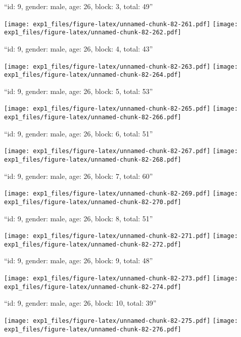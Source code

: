 \documentclass[11pt,,]{article}
\begin{document}
\newpage
[1] 

``id: 9, gender: male, age: 26, block: 3, total: 49''

\texttt{[image: exp1\_files/figure-latex/unnamed-chunk-82-261.pdf]}
\texttt{[image: exp1\_files/figure-latex/unnamed-chunk-82-262.pdf]}

\newpage
[1] 

``id: 9, gender: male, age: 26, block: 4, total: 43''

\texttt{[image: exp1\_files/figure-latex/unnamed-chunk-82-263.pdf]}
\texttt{[image: exp1\_files/figure-latex/unnamed-chunk-82-264.pdf]}

\newpage
[1] 

``id: 9, gender: male, age: 26, block: 5, total: 53''

\texttt{[image: exp1\_files/figure-latex/unnamed-chunk-82-265.pdf]}
\texttt{[image: exp1\_files/figure-latex/unnamed-chunk-82-266.pdf]}

\newpage
[1] 

``id: 9, gender: male, age: 26, block: 6, total: 51''

\texttt{[image: exp1\_files/figure-latex/unnamed-chunk-82-267.pdf]}
\texttt{[image: exp1\_files/figure-latex/unnamed-chunk-82-268.pdf]}

\newpage
[1] 

``id: 9, gender: male, age: 26, block: 7, total: 60''

\texttt{[image: exp1\_files/figure-latex/unnamed-chunk-82-269.pdf]}
\texttt{[image: exp1\_files/figure-latex/unnamed-chunk-82-270.pdf]}

\newpage
[1] 

``id: 9, gender: male, age: 26, block: 8, total: 51''

\texttt{[image: exp1\_files/figure-latex/unnamed-chunk-82-271.pdf]}
\texttt{[image: exp1\_files/figure-latex/unnamed-chunk-82-272.pdf]}

\newpage
[1] 

``id: 9, gender: male, age: 26, block: 9, total: 48''

\texttt{[image: exp1\_files/figure-latex/unnamed-chunk-82-273.pdf]}
\texttt{[image: exp1\_files/figure-latex/unnamed-chunk-82-274.pdf]}

\newpage
[1] 

``id: 9, gender: male, age: 26, block: 10, total: 39''

\texttt{[image: exp1\_files/figure-latex/unnamed-chunk-82-275.pdf]}
\texttt{[image: exp1\_files/figure-latex/unnamed-chunk-82-276.pdf]}
\end{document}
